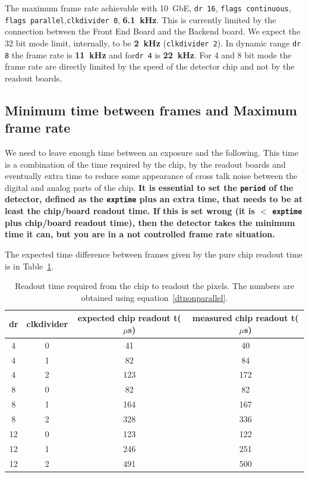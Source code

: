 \documentclass{article}
\begin{document}
The maximum frame rate achievable with 10~GbE, {\tt{dr 16}}, {\tt{flags continuous}}, {\tt{flags parallel}},{\tt{clkdivider 0}}, \textbf{6.1~kHz}. This is currently limited by the connection between the Front End Board and the Backend board. We expect the 32 bit mode limit, internally, to be \textbf{2~kHz} ({\tt{clkdivider 2}}).
 In dynamic range {\tt{dr 8}} the frame rate is \textbf{11~kHz} and for{\tt{dr 4}} is \textbf{22~kHz}. For 4 and 8 bit mode the frame rate are directly limited by the speed of the detector chip and not by the readout boards.    

\subsection{Minimum time between frames and Maximum frame rate}

We need to leave enough time between an exposure and the following. This time is a combination of the time required by the chip, by the readout boards and eventually extra time to reduce some appearance of cross talk noise between the digital and analog parts of the chip. 
\textbf{It is essential to set the {\tt{period}} of the detector, defined as the {\tt{exptime}} plus an extra time, that needs to be at least the chip/board readout time. If this is set wrong (it is $<$ {\tt{exptime}} plus chip/board readout time), then the detector takes the minimum time it can, but you are in a not controlled frame rate situation.} 

The expected time difference between frames given by the pure chip readout time is in Table~\ref{tchipro}.    
\begin{tiny}
\begin{table}
\begin{flushleft}
\begin{tabular}{|c|c|c|c|}
\hline
\tiny{dr} & \tiny{clkdivider} & \tiny{expected chip readout t($\mu$s)} & \tiny{measured chip readout t($\mu$s)}\\
\hline
4 & 0 & 41 & 40\\
4 & 1 & 82 & 84\\
4 & 2 & 123 & 172\\
\hline
\hline
8 & 0 & 82 & 82\\
8 & 1 & 164 & 167\\
8 & 2 & 328 & 336\\
\hline
\hline
12 & 0 & 123 &122\\
12 & 1 & 246 & 251\\
12 & 2 & 491 & 500\\
\hline
\end{tabular}
\caption{Readout time required from the chip to readout the pixels. The numbers are obtained using equation~\ref{dtnonparallel}.}
\label{tchipro}
\end{flushleft}
\end{table}
\end{tiny}
\end{document}
